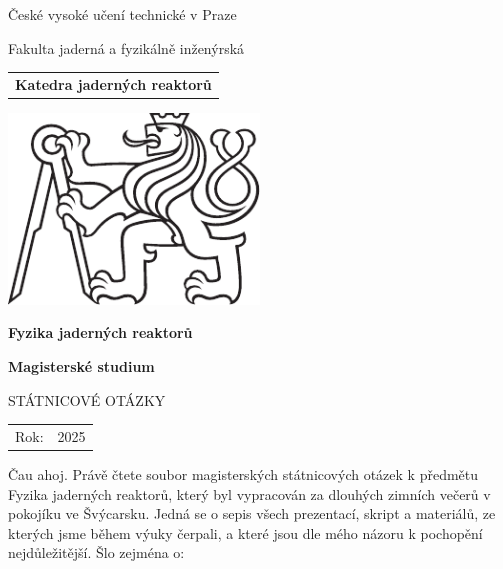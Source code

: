\documentclass[a4paper, 11pt]{article}
\newcommand{\logoCVUT}{\includegraphics[width = 0.5\textwidth]{img/symbol_cvut_konturova_verze_cb.pdf}}
\begin{document}
% 
% 

\thispagestyle{empty}

\begin{center}
	{\LARGE
		České vysoké učení technické v Praze \par
		Fakulta jaderná a fyzikálně inženýrská
	}
    \vspace{10mm}

    \begin{tabular}{c}
		\textbf{Katedra jaderných reaktorů} \\[3pt]
    \end{tabular}

   \vspace{10mm} \logoCVUT \vspace{15mm}

   {\huge \textbf{Fyzika jaderných reaktorů}\par}
   \vspace{5mm}
   {\huge \textbf{Magisterské studium}\par}

   \vspace{15mm}
   {\Large \MakeUppercase{Státnicové otázky}}

   \vfill
   {\large
    \begin{tabular}{ll}
    Rok: & 2025
    \end{tabular}
   }
\end{center}

\newpage
\thispagestyle{empty}

\vfill

\vspace{1em}
Čau ahoj. Právě čtete soubor magisterských státnicových otázek k předmětu Fyzika jaderných reaktorů, který byl vypracován za dlouhých zimních večerů v pokojíku ve Švýcarsku. Jedná se o sepis všech prezentací, skript a materiálů, ze kterých jsme během výuky čerpali, a které jsou dle mého názoru k pochopění nejdůležitější. Šlo zejména o:
\end{document}
